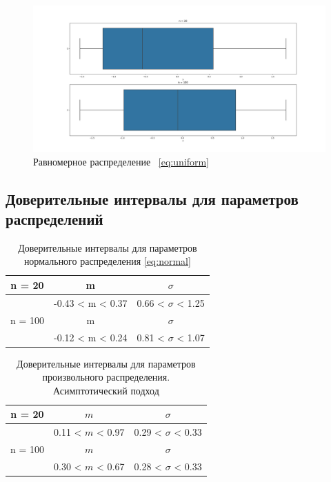 \documentclass[12pt,a4paper]{article}
\begin{document}
	\begin{figure}[htbp!]
		\begin{center}
			\includegraphics[width = 1.12\linewidth]{graphics/uniform.png}
			\caption{Равномерное распределение \ \eqref{eq:uniform}}
		\end{center}
	\end{figure}

	\newpage

	\subsection{Доверительные интервалы для параметров распределений}

	\begin{table}[htbp!]
		\centering
		\begin{tabular}{ |c|c|c| }
			\hline
			n = 20 & m & $\sigma$ \\
			\hline
			& -0.43 < m < 0.37 & 0.66 < $\sigma$ < 1.25 \\
			\hline
			n = 100 & m & $\sigma$ \\
			\hline
			& -0.12 < m < 0.24 & 0.81 < $\sigma$ < 1.07 \\
			\hline
		\end{tabular}
		\caption{Доверительные интервалы для параметров нормального распределения \eqref{eq:normal}}
		\label{table:1}
	\end{table}

	\begin{table}[htbp!]
		\centering
		\begin{tabular}{ |c|c|c| }
			\hline
			n = 20 & $m$ & $\sigma$ \\
			\hline
			& 0.11 < $m$ < 0.97 & 0.29 < $\sigma$ < 0.33 \\
			\hline
			n = 100 & $m$ & $\sigma$ \\
			\hline
			& 0.30 < $m$ < 0.67 & 0.28 < $\sigma$ < 0.33 \\
			\hline
		\end{tabular}
		\caption{Доверительные интервалы для параметров произвольного распределения. Асимптотический подход}
		\label{table:2}
	\end{table}
\end{document}
